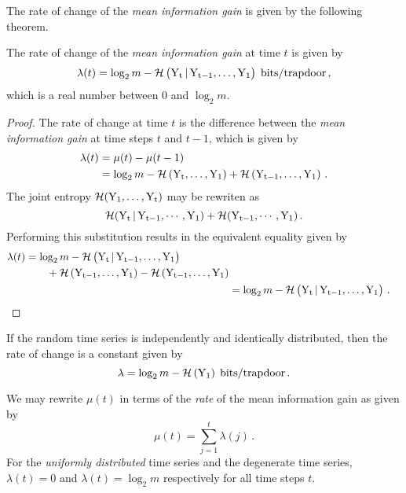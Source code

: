 \documentclass[ ../main.tex]{subfiles}
\begin{document}
The rate of change of the \emph{mean information gain} is given by the following theorem.
\begin{theorem}
The rate of change of the \emph{mean information gain} at time $t$ is given by
\begin{align}
    \lambda(t) = \log_2 m - \entropy\left(\rv{Y_t} \given \rv{Y_{t-1}},\ldots,\rv{Y_1}\right) \; \si{bits \per trapdoor}\,,
\end{align}
which is a real number between $0$ and $\log_2 m$.
\end{theorem}
\begin{proof}
The rate of change at time $t$ is the difference between the \emph{mean information gain} at time steps $t$ and $t-1$, which is given by
\begin{align}
    \lambda(t) &= \mu(t) - \mu(t-1)\\
               &= \log_2 m - \entropy\left(\rv{Y_t}, \ldots,\rv{Y_1}\right) + \entropy\left(\rv{Y_{t-1}},\ldots,\rv{Y_1}\right)\,.
\end{align}
The joint entropy $\entropy(\rv{Y_1},\ldots,\rv{Y_t})$ may be rewriten as \begin{equation}
    \entropy(\rv{Y_t} \given \rv{Y_{t-1}}, \cdots, \rv{Y_1}) + \entropy(\rv{Y_{t-1}}, \cdots, \rv{Y_1})\,.
\end{equation}
Performing this substitution results in the equivalent equality given by
\begin{align}
\begin{split}
    \lambda(t)
        &= \log_2 m - \entropy\left(\rv{Y_t} \given \rv{Y_{t-1}}, \ldots,\rv{Y_1}\right)\\
        &\qquad+ \entropy\left(\rv{Y_{t-1}}, \ldots,\rv{Y_1}\right) -\entropy\left(\rv{Y_{t-1}},\ldots,\rv{Y_1}\right)
\end{split}\\
        &= \log_2 m - \entropy\left(\rv{Y_t} \given \rv{Y_{t-1}}, \ldots,\rv{Y_1}\right)\,.
\end{align}
\end{proof}
If the random time series is independently and identically distributed, then the rate of change is a constant given by
\begin{equation}
    \lambda = \log_2 m - \entropy\left(\rv{Y_1}\right) \; \si{bits \per trapdoor}\,.
\end{equation}

We may rewrite $\mu(t)$ in terms of the \emph{rate} of the mean information gain as given by
\begin{equation}
    \mu(t) = \sum_{j=1}^{t} \lambda(j)\,.
\end{equation}
For the \emph{uniformly distributed} time series and the degenerate time series, $\lambda(t) = 0$ and $\lambda(t) = \log_2 m$ respectively for all time steps $t$.
\end{document}
